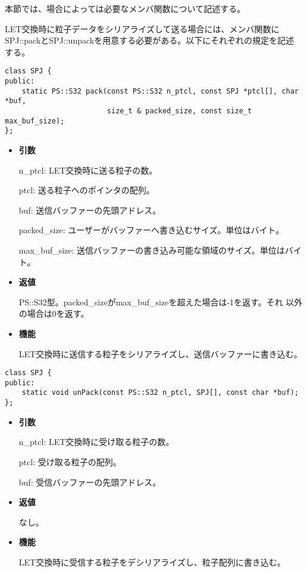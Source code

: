 
本節では、場合によっては必要なメンバ関数について記述する。

\label{sec:SPJ:serialize}

LET交換時に粒子データをシリアライズして送る場合には、メンバ関数に
SPJ::packとSPJ::unpackを用意する必要がある。以下にそれぞれの規定を記述
する。



\begin{screen}
\begin{verbatim}
class SPJ {
public:
    static PS::S32 pack(const PS::S32 n_ptcl, const SPJ *ptcl[], char *buf, 
                        size_t & packed_size, const size_t max_buf_size);
};
\end{verbatim}
\end{screen}

\begin{itemize}

\item {\bf 引数}

  n\_ptcl: LET交換時に送る粒子の数。
  

  ptcl: 送る粒子へのポインタの配列。

  buf: 送信バッファーの先頭アドレス。
  
  packed\_size: ユーザーがバッファーへ書き込むサイズ。単位はバイト。
  
  max\_buf\_size: 送信バッファーの書き込み可能な領域のサイズ。単位はバイト。

\item {\bf 返値}

  PS::S32型。packed\_sizeがmax\_buf\_sizeを超えた場合は-1を返す。それ
  以外の場合は0を返す。
  
\item {\bf 機能}

 LET交換時に送信する粒子をシリアライズし、送信バッファーに書き込む。

\end{itemize}



\begin{screen}
\begin{verbatim}
class SPJ {
public:
    static void unPack(const PS::S32 n_ptcl, SPJ[], const char *buf);
};
\end{verbatim}
\end{screen}

\begin{itemize}

\item {\bf 引数}

  n\_ptcl: LET交換時に受け取る粒子の数。
  
  ptcl: 受け取る粒子の配列。
  
  buf: 受信バッファーの先頭アドレス。

\item {\bf 返値}

  なし。

\item {\bf 機能}

 LET交換時に受信する粒子をデシリアライズし、粒子配列に書き込む。

\end{itemize}
